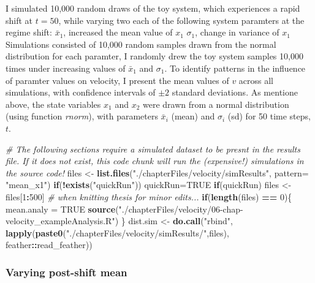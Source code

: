 \documentclass[12pt,twoside,openany]{reedthesis}
\newenvironment{Shaded}{\begin{snugshade}}{\end{snugshade}}
\newcommand{\KeywordTok}[1]{\textcolor[rgb]{0.13,0.29,0.53}{\textbf{#1}}}
\newcommand{\DataTypeTok}[1]{\textcolor[rgb]{0.13,0.29,0.53}{#1}}
\newcommand{\DecValTok}[1]{\textcolor[rgb]{0.00,0.00,0.81}{#1}}
\newcommand{\StringTok}[1]{\textcolor[rgb]{0.31,0.60,0.02}{#1}}
\newcommand{\CommentTok}[1]{\textcolor[rgb]{0.56,0.35,0.01}{\textit{#1}}}
\newcommand{\OtherTok}[1]{\textcolor[rgb]{0.56,0.35,0.01}{#1}}
\newcommand{\ControlFlowTok}[1]{\textcolor[rgb]{0.13,0.29,0.53}{\textbf{#1}}}
\newcommand{\OperatorTok}[1]{\textcolor[rgb]{0.81,0.36,0.00}{\textbf{#1}}}
\newcommand{\NormalTok}[1]{#1}
\begin{document}
I simulated 10,000 random draws of the toy system, which experiences a
rapid shift at \(t = 50\), while varying two each of the following
system paramters at the regime shift: \(\bar{x}_1\), increased the mean
value of \(x_1\) \(\sigma_1\), change in variance of \(x_1\) Simulations
consisted of 10,000 random samples drawn from the normal distribution
for each paramter, I randomly drew the toy system samples 10,000 times
under increasing values of \(\bar{x}_1\) and \(\sigma_1\). To identify
patterns in the influence of paramter values on velocity, I present the
mean values of \(v\) across all simulations, with confidence intervals
of \(\pm 2\) standard deviations. As mentione above, the state variables
\(x_1\) and \(x_2\) were drawn from a normal distribution (using
function \emph{rnorm}), with parameters \(\bar{x}_i\) (mean) and
\(\sigma_i\) (sd) for 50 time steps, \(t\).
\begin{Shaded}
\begin{Highlighting}[]
\CommentTok{# The following sections require a simulated dataset to be presnt in the results file. If it does not exist, this code chunk will run the (expensive!) simulations in the source code!}
\NormalTok{files <-}\StringTok{ }\KeywordTok{list.files}\NormalTok{(}\StringTok{"./chapterFiles/velocity/simResults"}\NormalTok{, }\DataTypeTok{pattern=} \StringTok{"mean_x1"}\NormalTok{)}
\ControlFlowTok{if}\NormalTok{(}\OperatorTok{!}\KeywordTok{exists}\NormalTok{(}\StringTok{"quickRun"}\NormalTok{)) quickRun=}\OtherTok{TRUE}
\ControlFlowTok{if}\NormalTok{(quickRun) files <-}\StringTok{ }\NormalTok{files[}\DecValTok{1}\OperatorTok{:}\DecValTok{500}\NormalTok{] }\CommentTok{# when knitting thesis for minor edits...}
\ControlFlowTok{if}\NormalTok{(}\KeywordTok{length}\NormalTok{(files) }\OperatorTok{==}\StringTok{ }\DecValTok{0}\NormalTok{)\{}
\NormalTok{  mean.analy =}\StringTok{ }\OtherTok{TRUE}
  \KeywordTok{source}\NormalTok{(}\StringTok{"./chapterFiles/velocity/06-chap-velocity_exampleAnalysis.R"}\NormalTok{)}
\NormalTok{\}}
\NormalTok{dist.sim <-}\StringTok{ }\KeywordTok{do.call}\NormalTok{(}\StringTok{"rbind"}\NormalTok{, }\KeywordTok{lapply}\NormalTok{(}\KeywordTok{paste0}\NormalTok{(}\StringTok{"./chapterFiles/velocity/simResults/"}\NormalTok{,files),}
\NormalTok{        feather}\OperatorTok{::}\NormalTok{read_feather))}
\end{Highlighting}
\end{Shaded}
\subsubsection{Varying post-shift mean}\label{varying-post-shift-mean}
\end{document}
